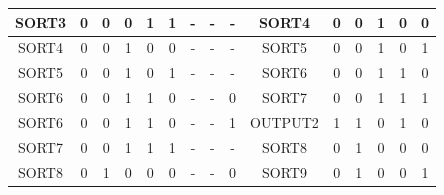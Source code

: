 \begin{table}[H]
{\begin{tabular}{|cccccc|ccc|cccccc|}
  \multicolumn{1}{|c|}{SORT3}  & \multicolumn{1}{c|}{0}  & \multicolumn{1}{c|}{0}  & \multicolumn{1}{c|}{0}  & \multicolumn{1}{c|}{1}  & 1  & \multicolumn{1}{c|}{-}    & \multicolumn{1}{c|}{-}        & -    & \multicolumn{1}{c|}{SORT4}   & \multicolumn{1}{c|}{0}  & \multicolumn{1}{c|}{0}  & \multicolumn{1}{c|}{1}  & \multicolumn{1}{c|}{0}  & 0  \\ \hline
  \multicolumn{1}{|c|}{SORT4}  & \multicolumn{1}{c|}{0}  & \multicolumn{1}{c|}{0}  & \multicolumn{1}{c|}{1}  & \multicolumn{1}{c|}{0}  & 0  & \multicolumn{1}{c|}{-}    & \multicolumn{1}{c|}{-}        & -    & \multicolumn{1}{c|}{SORT5}   & \multicolumn{1}{c|}{0}  & \multicolumn{1}{c|}{0}  & \multicolumn{1}{c|}{1}  & \multicolumn{1}{c|}{0}  & 1  \\ \hline
  \multicolumn{1}{|c|}{SORT5}  & \multicolumn{1}{c|}{0}  & \multicolumn{1}{c|}{0}  & \multicolumn{1}{c|}{1}  & \multicolumn{1}{c|}{0}  & 1  & \multicolumn{1}{c|}{-}    & \multicolumn{1}{c|}{-}        & -    & \multicolumn{1}{c|}{SORT6}   & \multicolumn{1}{c|}{0}  & \multicolumn{1}{c|}{0}  & \multicolumn{1}{c|}{1}  & \multicolumn{1}{c|}{1}  & 0  \\ \hline
  \multicolumn{1}{|c|}{SORT6}  & \multicolumn{1}{c|}{0}  & \multicolumn{1}{c|}{0}  & \multicolumn{1}{c|}{1}  & \multicolumn{1}{c|}{1}  & 0  & \multicolumn{1}{c|}{-}    & \multicolumn{1}{c|}{-}        & 0    & \multicolumn{1}{c|}{SORT7}   & \multicolumn{1}{c|}{0}  & \multicolumn{1}{c|}{0}  & \multicolumn{1}{c|}{1}  & \multicolumn{1}{c|}{1}  & 1  \\ \hline
  \multicolumn{1}{|c|}{SORT6}  & \multicolumn{1}{c|}{0}  & \multicolumn{1}{c|}{0}  & \multicolumn{1}{c|}{1}  & \multicolumn{1}{c|}{1}  & 0  & \multicolumn{1}{c|}{-}    & \multicolumn{1}{c|}{-}        & 1    & \multicolumn{1}{c|}{OUTPUT2} & \multicolumn{1}{c|}{1}  & \multicolumn{1}{c|}{1}  & \multicolumn{1}{c|}{0}  & \multicolumn{1}{c|}{1}  & 0  \\ \hline
  \multicolumn{1}{|c|}{SORT7}  & \multicolumn{1}{c|}{0}  & \multicolumn{1}{c|}{0}  & \multicolumn{1}{c|}{1}  & \multicolumn{1}{c|}{1}  & 1  & \multicolumn{1}{c|}{-}    & \multicolumn{1}{c|}{-}        & -    & \multicolumn{1}{c|}{SORT8}   & \multicolumn{1}{c|}{0}  & \multicolumn{1}{c|}{1}  & \multicolumn{1}{c|}{0}  & \multicolumn{1}{c|}{0}  & 0  \\ \hline
  \multicolumn{1}{|c|}{SORT8}  & \multicolumn{1}{c|}{0}  & \multicolumn{1}{c|}{1}  & \multicolumn{1}{c|}{0}  & \multicolumn{1}{c|}{0}  & 0  & \multicolumn{1}{c|}{-}    & \multicolumn{1}{c|}{-}        & 0    & \multicolumn{1}{c|}{SORT9}   & \multicolumn{1}{c|}{0}  & \multicolumn{1}{c|}{1}  & \multicolumn{1}{c|}{0}  & \multicolumn{1}{c|}{0}  & 1  \\ \hline

\end{tabular}}
\end{table}
